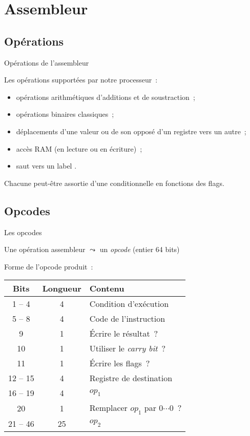 \documentclass[11pt]{beamer}
\begin{document}
\section{Assembleur}

\subsection{Opérations}

\begin{frame}{Opérations de l'assembleur}

Les opérations supportées par notre processeur~:

\begin{itemize}
\item opérations arithmétiques d'additions et de soustraction~;
\item opérations binaires classiques~;
\item déplacements d'une valeur ou de son opposé d'un registre vers un autre~;
\item accès RAM (en lecture ou en  écriture)~;
\item saut vers un label .
\end{itemize}

Chacune peut-être assortie d'une conditionnelle en fonctions des flags.

\end{frame}

\subsection{Opcodes}

\begin{frame}{Les opcodes}

Une opération assembleur $\leadsto$ un \textit{opcode} (entier 64 bits)
\vspace{1em}

Forme de l'opcode produit~:

\begin{center}
\begin{tabular}{|c|c|l|}
\hline
\textbf{Bits} & \textbf{Longueur} & \textbf{Contenu}\\
\hline
1 -- 4 & 4 & Condition d'exécution \\
5 -- 8 & 4 & Code de l'instruction \\
9 & 1 & Écrire le résultat~? \\
10 & 1 & Utiliser le \textit{carry bit}~?  \\
11 & 1 & Écrire les flags~? \\
12 -- 15 & 4 & Registre de destination \\
16 -- 19 & 4 & $op_1$ \\
20 & 1 & Remplacer $op_1$ par $0\cdots 0$~? \\
21 -- 46 & 25 & $op_2$ \\ \hline
\end{tabular}
\end{center}

\end{frame}
\end{document}
